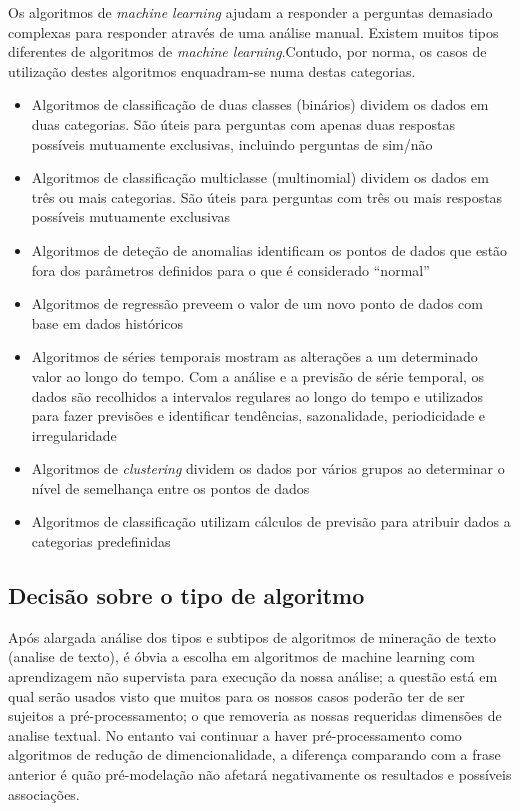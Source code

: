 \documentclass[a4paper,10pt]{article}
\begin{document}
Os algoritmos de \textit{machine learning} ajudam a responder a perguntas demasiado complexas para responder através de uma análise manual.
Existem muitos tipos diferentes de algoritmos de \textit{machine learning}.Contudo, por norma, os casos de utilização destes algoritmos enquadram-se numa destas categorias.
\begin{itemize}
    \item Algoritmos de classificação de duas classes (binários) dividem os dados em duas categorias. São úteis para perguntas com apenas duas respostas possíveis mutuamente exclusivas, incluindo perguntas de sim/não
    \item Algoritmos de classificação multiclasse (multinomial) dividem os dados em três ou mais categorias. São úteis para perguntas com três ou mais respostas possíveis mutuamente exclusivas
    \item Algoritmos de deteção de anomalias identificam os pontos de dados que estão fora dos parâmetros definidos para o que é considerado ``normal''
    \item Algoritmos de regressão preveem o valor de um novo ponto de dados com base em dados históricos
    \item Algoritmos de séries temporais mostram as alterações a um determinado valor ao longo do tempo. Com a análise e a previsão de série temporal, os dados são recolhidos a intervalos regulares ao longo do tempo e utilizados para fazer previsões e identificar tendências, sazonalidade, periodicidade e irregularidade
    \item Algoritmos de \textit{clustering} dividem os dados por vários grupos ao determinar o nível de semelhança entre os pontos de dados
    \item Algoritmos de classificação utilizam cálculos de previsão para atribuir dados a categorias predefinidas
\end{itemize}

\subsection{Decisão sobre o tipo de algoritmo}

Após alargada análise dos tipos e subtipos de algoritmos de mineração de texto (analise de texto), é óbvia a escolha em algoritmos de machine learning com aprendizagem não supervista para execução da nossa análise; a questão está em qual serão usados visto que muitos para os nossos casos poderão ter de ser sujeitos a pré-processamento; o que removeria as nossas requeridas dimensões de analise textual.
No entanto vai continuar a haver pré-processamento como algoritmos de redução de dimencionalidade, a diferença comparando com a frase anterior é quão pré-modelação não afetará negativamente os resultados e possíveis associações.
\end{document}

